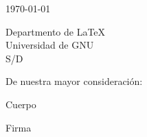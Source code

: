 \documentclass[a4paper,12pt]{article}
\begin{document}
\begin{flushright}
\today
\end{flushright}

\vspace{-1em}

\noindent Departmento de \LaTeX \\ Universidad de GNU \\ S/D

\vspace{1em}

\noindent De nuestra mayor consideración:

Cuerpo

\vspace{4em}
\begin{center}
Firma
\end{center}
\end{document}
